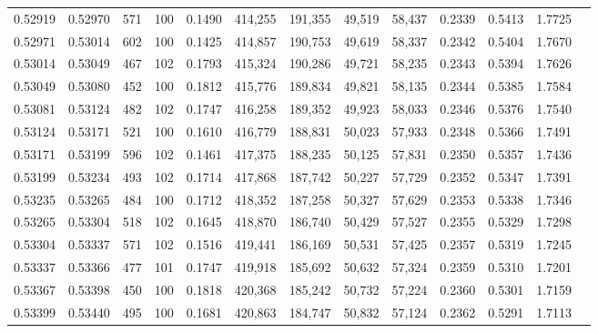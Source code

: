 \begin{tabular}{rrrrrrrrrrrrr}
0.52919 & 0.52970 &   571 & 100 &                                     0.1490 & 414,255 & 191,355 &  49,519 &  58,437 & 0.2339 & 0.5413 & 1.7725 \\
0.52971 & 0.53014 &   602 & 100 &                                     0.1425 & 414,857 & 190,753 &  49,619 &  58,337 & 0.2342 & 0.5404 & 1.7670 \\
0.53014 & 0.53049 &   467 & 102 &                                     0.1793 & 415,324 & 190,286 &  49,721 &  58,235 & 0.2343 & 0.5394 & 1.7626 \\
0.53049 & 0.53080 &   452 & 100 &                                     0.1812 & 415,776 & 189,834 &  49,821 &  58,135 & 0.2344 & 0.5385 & 1.7584 \\
0.53081 & 0.53124 &   482 & 102 &                                     0.1747 & 416,258 & 189,352 &  49,923 &  58,033 & 0.2346 & 0.5376 & 1.7540 \\
0.53124 & 0.53171 &   521 & 100 &                                     0.1610 & 416,779 & 188,831 &  50,023 &  57,933 & 0.2348 & 0.5366 & 1.7491 \\
0.53171 & 0.53199 &   596 & 102 &                                     0.1461 & 417,375 & 188,235 &  50,125 &  57,831 & 0.2350 & 0.5357 & 1.7436 \\
0.53199 & 0.53234 &   493 & 102 &                                     0.1714 & 417,868 & 187,742 &  50,227 &  57,729 & 0.2352 & 0.5347 & 1.7391 \\
0.53235 & 0.53265 &   484 & 100 &                                     0.1712 & 418,352 & 187,258 &  50,327 &  57,629 & 0.2353 & 0.5338 & 1.7346 \\
0.53265 & 0.53304 &   518 & 102 &                                     0.1645 & 418,870 & 186,740 &  50,429 &  57,527 & 0.2355 & 0.5329 & 1.7298 \\
0.53304 & 0.53337 &   571 & 102 &                                     0.1516 & 419,441 & 186,169 &  50,531 &  57,425 & 0.2357 & 0.5319 & 1.7245 \\
0.53337 & 0.53366 &   477 & 101 &                                     0.1747 & 419,918 & 185,692 &  50,632 &  57,324 & 0.2359 & 0.5310 & 1.7201 \\
0.53367 & 0.53398 &   450 & 100 &                                     0.1818 & 420,368 & 185,242 &  50,732 &  57,224 & 0.2360 & 0.5301 & 1.7159 \\
0.53399 & 0.53440 &   495 & 100 &                                     0.1681 & 420,863 & 184,747 &  50,832 &  57,124 & 0.2362 & 0.5291 & 1.7113 \\

\end{tabular}
